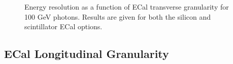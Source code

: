 \begin{figure}
\centering
\caption[Energy resolution as a function of ECal transverse granularity for 100 GeV photons.  Results are given for both the silicon and scintillator ECal options.]{Energy resolution as a function of ECal transverse granularity for 100 GeV photons.  Results are given for both the silicon and scintillator ECal options.}
\label{fig:ecalcellsizegamma}
\end{figure}

\subsection{ECal Longitudinal Granularity}


